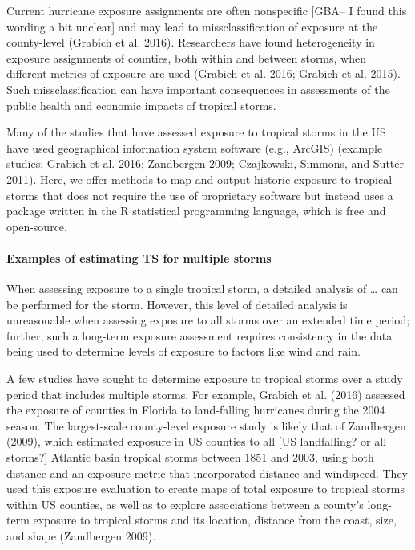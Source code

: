 \documentclass[]{elsarticle} %
\begin{document}
Current hurricane exposure assignments are often nonspecific {[}GBA-- I
found this wording a bit unclear{]} and may lead to missclassification
of exposure at the county-level (Grabich et al. 2016). Researchers have
found heterogeneity in exposure assignments of counties, both within and
between storms, when different metrics of exposure are used (Grabich et
al. 2016; Grabich et al. 2015). Such missclassification can have
important consequences in assessments of the public health and economic
impacts of tropical storms.

Many of the studies that have assessed exposure to tropical storms in
the US have used geographical information system software (e.g., ArcGIS)
(example studies: Grabich et al. 2016; Zandbergen 2009; Czajkowski,
Simmons, and Sutter 2011). Here, we offer methods to map and output
historic exposure to tropical storms that does not require the use of
proprietary software but instead uses a package written in the R
statistical programming language, which is free and open-source.

\paragraph{Examples of estimating TS for multiple
storms}\label{examples-of-estimating-ts-for-multiple-storms}

When assessing exposure to a single tropical storm, a detailed analysis
of \ldots{} can be performed for the storm. However, this level of
detailed analysis is unreasonable when assessing exposure to all storms
over an extended time period; further, such a long-term exposure
assessment requires consistency in the data being used to determine
levels of exposure to factors like wind and rain.

A few studies have sought to determine exposure to tropical storms over
a study period that includes multiple storms. For example, Grabich et
al. (2016) assessed the exposure of counties in Florida to land-falling
hurricanes during the 2004 season. The largest-scale county-level
exposure study is likely that of Zandbergen (2009), which estimated
exposure in US counties to all {[}US landfalling? or all storms?{]}
Atlantic basin tropical storms between 1851 and 2003, using both
distance and an exposure metric that incorporated distance and
windspeed. They used this exposure evaluation to create maps of total
exposure to tropical storms within US counties, as well as to explore
associations between a county's long-term exposure to tropical storms
and its location, distance from the coast, size, and shape (Zandbergen
2009).
\end{document}
